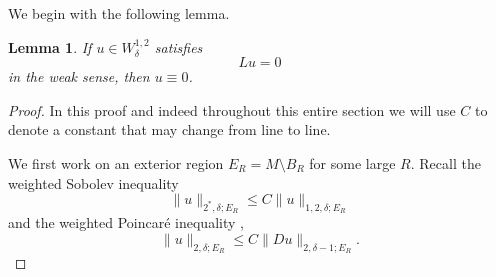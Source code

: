 \documentclass[a4paper,11pt,reqno]{amsart}
\theoremstyle{plain}
\newtheorem{lem}[thm]{Lemma}
\theoremstyle{definition}
\theoremstyle{remark}
\numberwithin{equation}{section}
\begin{document}
We begin with the following lemma.
\begin{lem}\label{lem-ker}
	If $u\in W^{1,2}_\delta$ satisfies
	\begin{equation*}
		Lu=0
	\end{equation*}
	in the weak sense, then $u\equiv 0$.
\end{lem}
\begin{proof}
	In this proof and indeed throughout this entire section we will use $C$ to denote a constant that may change from line to line.
	
	We first work on an exterior region $E_R=M\setminus B_R$ for some large $R$. Recall the weighted Sobolev inequality \cite[Theorem 1.2]{Bartnik86}
	\begin{equation*}
		\|u\|_{2^*,\delta;E_R}\leq C\| u \|_{1,2,\delta;E_R}
	\end{equation*}
	and the weighted Poincar\'e inequality \cite[Lemma 3.10]{Bartnik2005PhaseSpace},
	\begin{equation*}
		\|u\|_{2,\delta;E_R}\leq C \|Du\|_{2,\delta-1;E_R}.
	\end{equation*}
	

\end{proof}
\end{document}
